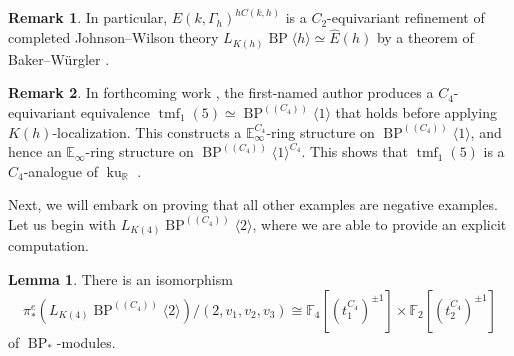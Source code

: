\documentclass[a4paper, 10pt]{article}
\newcommand{\E}{\mathbb E}  %
\newcommand{\F}{\mathbb F}
\newcommand{\R}{\mathbb R}
\newcommand{\tmf}{\operatorname{tmf}}
\newcommand{\ku}{\operatorname{ku}}
\newcommand{\BP}{\operatorname{BP}}
\newcommand{\kuR}{\ku_{\R}}
\theoremstyle{definition}
\newtheorem{lemma}[lemma]{Lemma}
\newtheorem{remark}[remark]{Remark}
\begin{document}
\begin{remark} \label{remark: Baker wuergler}
    In particular, $E(k, \Gamma_h)^{hC(k,h)}$ is a $C_2$-equivariant refinement of completed Johnson--Wilson theory $L_{K(h)}\BP\langle h \rangle \simeq \widehat{E}(h)$ by a theorem of Baker--Würgler \cite{bakerWuergler1989liftings}.
\end{remark}

\begin{remark}
    In forthcoming work \cite{Qtmf15},
    the first-named author produces a \(C_4\)-equivariant equivalence \(\tmf_1(5)\simeq \BP^{(\!(C_4)\!)}\langle 1\rangle\) that holds before applying \(K(h)\)-localization. This constructs a \(\E^{C_4}_\infty\)-ring structure on \(\BP^{(\!(C_4)\!)}\langle 1\rangle\), and hence an \(\E_\infty\)-ring structure on \(\BP^{(\!(C_4)\!)}\langle 1\rangle^{C_4}\).
    This shows that \(\tmf_1(5)\) is a \(C_4\)-analogue of \(\kuR\) \cite{HillHopkinsRavenel2017C4RealKTheory}.
\end{remark}

Next, we will embark on proving that all other examples are negative examples. Let us begin with $L_{K(4)} \BP^{( \! ( C_4 ) \! )} \langle 2 \rangle$, where we are able to provide an explicit computation. 

\begin{lemma} \label{lemma: BP C4 2 mod I computation}
    There is an isomorphism
    \[ \pi_*^e\left(L_{K(4)}\BP^{( \! ( C_4 ) \! )}\langle 2 \rangle \right)/(2,v_1, v_2, v_3) \cong \F_4 \left[(t_1^{C_4})^{\pm 1} \right] \times \F_2 \left[(t_2^{C_4})^{\pm 1} \right] \]
    of $\BP_*$-modules.
\end{lemma}
\end{document}
